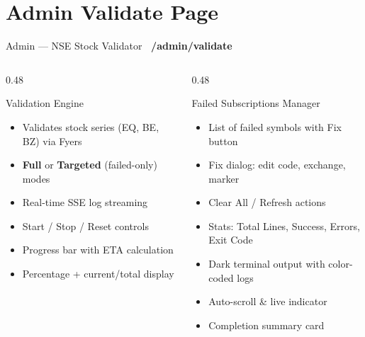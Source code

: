 \documentclass[aspectratio=169, 11pt]{beamer}
\newcommand{\tagbox}[2]{\colorbox{#1}{\scriptsize\color{white}\textbf{~#2~}}}
\begin{document}
\section{Admin Validate Page}
\begin{frame}{Admin — NSE Stock Validator \hfill \tagbox{accentred}{/admin/validate}}
\begin{columns}[T]
\begin{column}{0.48\textwidth}
\begin{block}{Validation Engine}
\begin{itemize}
  \item Validates stock series (EQ, BE, BZ) via Fyers
  \item \textbf{Full} or \textbf{Targeted} (failed-only) modes
  \item Real-time SSE log streaming
  \item Start / Stop / Reset controls
  \item Progress bar with ETA calculation
  \item Percentage + current/total display
\end{itemize}
\end{block}
\end{column}
\begin{column}{0.48\textwidth}
\begin{block}{Failed Subscriptions Manager}
\begin{itemize}
  \item List of failed symbols with Fix button
  \item Fix dialog: edit code, exchange, marker
  \item Clear All / Refresh actions
  \item Stats: Total Lines, Success, Errors, Exit Code
  \item Dark terminal output with color-coded logs
  \item Auto-scroll \& live indicator
  \item Completion summary card
\end{itemize}
\end{block}
\end{column}
\end{columns}
\end{frame}

\end{document}
